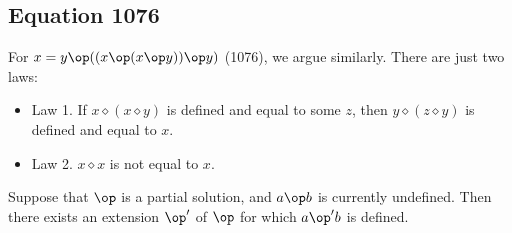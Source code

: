 \subsection{Equation 1076}
For $x = y \op ((x \op (x \op y)) \op y)$ (1076), we argue similarly. There are just two laws:
\begin{itemize}
    \item Law 1.  If $x \diamond (x \diamond y)$ is defined and equal to some $z$,
then $y \diamond (z \diamond y)$ is defined and equal to $x$.
    \item Law 2.  $x \diamond x$ is not equal to $x$.
\end{itemize}

\begin{lemma}[1076 extension]\label{1076-extension}\leanok{}  Suppose that $\op$ is a partial solution, and $a \op b$ is currently undefined.  Then there exists an extension $\op'$ of $\op$ for which $a \op' b$ is defined.
\end{lemma}
